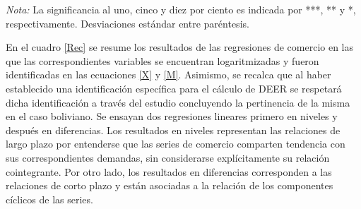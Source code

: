 \documentclass[12pt,letterpaper]{article}
\begin{document}
\begin{table}
\caption{Regresiones de Comercio Naïve}
\begin{center}
\end{center}
\begin{scriptsize}
\emph{Nota:} La significancia al uno, cinco y diez por ciento es indicada por ***, ** y *, respectivamente. Desviaciones estándar entre paréntesis.
\end{scriptsize}								
\label{Rec}	
\end{table}	

En el cuadro \ref{Rec} se resume los resultados de las regresiones de comercio en las que las correspondientes variables se encuentran logaritmizadas y fueron identificadas en las ecuaciones \ref{X} y \ref{M}. Asimismo, se recalca que al haber establecido una identificación específica para el cálculo de DEER se respetará dicha identificación a través del estudio concluyendo la pertinencia de la misma en el caso boliviano. Se ensayan dos regresiones lineares primero en niveles y después en diferencias. Los resultados en niveles representan las relaciones de largo plazo por entenderse que las series de comercio comparten tendencia con sus correspondientes demandas, sin considerarse explícitamente su relación cointegrante. Por otro lado, los resultados en diferencias corresponden a las relaciones de corto plazo y están asociadas a la relación de los componentes cíclicos de las series.
\end{document}
